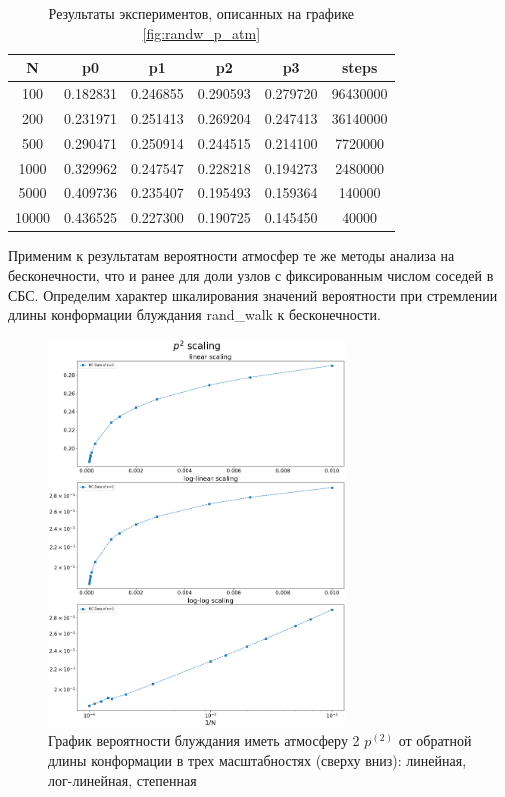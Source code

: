 \begin{table}[h] 
\centering
\begin{tabular}{|c|c|c|c|c|c|}
\hline
N & p0 & p1 & p2 & p3 & steps \\ \hline
100 & 0.182831 & 0.246855 & 0.290593 & 0.279720 & 96430000 \\ \hline 
200 & 0.231971 & 0.251413 & 0.269204 & 0.247413 & 36140000 \\ \hline
500 & 0.290471 & 0.250914 & 0.244515 & 0.214100 & 7720000 \\ \hline
1000 & 0.329962 & 0.247547 & 0.228218 & 0.194273 & 2480000 \\ \hline
5000 & 0.409736 & 0.235407 & 0.195493 & 0.159364 & 140000 \\ \hline
10000 & 0.436525 & 0.227300 & 0.190725 & 0.145450 & 40000 \\ \hline
\end{tabular}
\caption{Результаты экспериментов, описанных на графике \ref{fig:randw_p_atm}}
\label{tab:randw_p_atm}
\end{table}

Применим к результатам вероятности атмосфер те же методы анализа на бесконечности, что и ранее для доли узлов с фиксированным числом соседей в СБС.
Определим характер шкалирования значений вероятности при стремлении длины конформации блуждания rand\_walk к бесконечности.

\begin{figure}[h]
\centering
\includegraphics[width=0.7\textwidth]{Sections/Images_2/p_2_scale_example.png}
\caption{График вероятности блуждания иметь атмосферу 2 $p^{(2)}$ от обратной длины конформации в трех масштабностях (сверху вниз): линейная, лог-линейная, степенная}
\label{fig:p_2_scale}
\end{figure}

